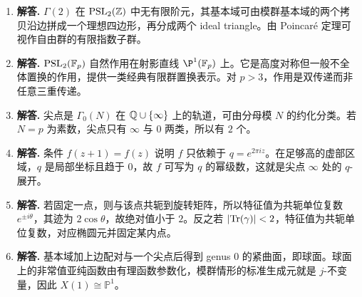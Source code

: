 \begin{enumerate}[label=\textbf{\arabic*.}, leftmargin=*, itemsep=1em]
\item \textbf{解答.} $\Gamma(2)$ 在 $\mathrm{PSL}_2(\mathbb{Z})$ 中无有限阶元，其基本域可由模群基本域的两个拷贝沿边拼成一个理想四边形，再分成两个 ideal triangle。由 Poincar\'e 定理可视作自由群的有限指数子群。
\item \textbf{解答.} $\mathrm{PSL}_2(\mathbb{F}_p)$ 自然作用在射影直线 $\P^1(\F_p)$ 上。它是高度对称但一般不全体置换的作用，提供一类经典有限群置换表示。对 $p>3$，作用是双传递而非任意三重传递。
\item \textbf{解答.} 尖点是 $\Gamma_0(N)$ 在 $\mathbb{Q}\cup\{\infty\}$ 上的轨道，可由分母模 $N$ 的约化分类。若 $N=p$ 为素数，尖点只有 $\infty$ 与 $0$ 两类，所以有 $2$ 个。
\item \textbf{解答.} 条件 $f(z+1)=f(z)$ 说明 $f$ 只依赖于 $q=e^{2\pi iz}$。在足够高的虚部区域，$q$ 是局部坐标且趋于 $0$，故 $f$ 可写为 $q$ 的幂级数，这就是尖点 $\infty$ 处的 $q$-展开。
\item \textbf{解答.} 若固定一点，则与该点共轭到旋转矩阵，所以特征值为共轭单位复数 $e^{\pm i\theta}$，其迹为 $2\cos\theta$，故绝对值小于 $2$。反之若 $|\mathrm{Tr}(\gamma)|<2$，特征值为共轭单位复数，对应椭圆元并固定某内点。
\item \textbf{解答.} 基本域加上边配对与一个尖点后得到 genus $0$ 的紧曲面，即球面。球面上的非常值亚纯函数由有理函数参数化，模群情形的标准生成元就是 $j$-不变量，因此 $X(1)\cong\mathbb P^1$。
\end{enumerate}
